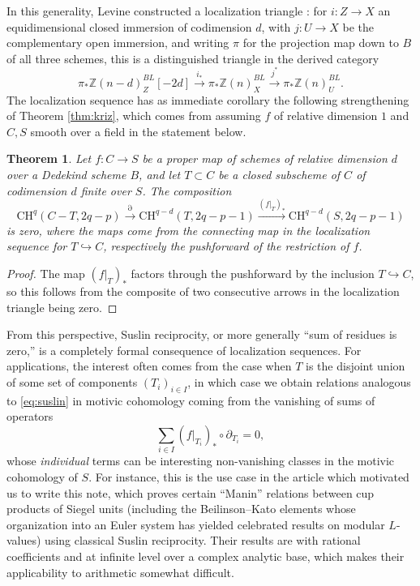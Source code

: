\documentclass[a4paper,reqno,11pt]{amsart}
\theoremstyle{plain}
\newtheorem{theorem}{Theorem}[section]
\theoremstyle{definition}
\theoremstyle{remark}
\newcommand{\CH}{{\mathrm{CH}}}
\newcommand{\Z}{\mathbb{Z}}
\begin{document}
In this generality, Levine constructed a localization triangle \cite[Theorem 1.7]{L2}: for $i:Z\to X$ an equidimensional closed immersion of codimension $d$, with $j:U\to X$ be the complementary open immersion, and writing $\pi$ for the projection map down to $B$ of all three schemes, this is a distinguished triangle in the derived category
\[
\pi_*\Z(n-d)^{BL}_Z[-2d] \xrightarrow{i_*} \pi_*\Z(n)_X^{BL} \xrightarrow{j^*} \pi_*\Z(n)_U^{BL}.
\]
The localization sequence has as immediate corollary the following strengthening of Theorem \ref{thm:kriz}, which comes from assuming $f$ of relative dimension $1$ and $C,S$ smooth over a field in the statement below.

\begin{theorem} \label{thm:naive}
    Let $f:C\to S$ be a proper map of schemes of relative dimension $d$ over a Dedekind scheme $B$, and let $T\subset C$ be a closed subscheme of $C$ of codimension $d$ finite over $S$. The composition
    \[
        \CH^q(C-T, 2q-p)\xrightarrow{\partial} \CH^{q-d}(T,2q-p-1) \xrightarrow{(f|_T)_*} \CH^{q-d}(S, 2q-p-1)
    \]
    is zero, where the maps come from the connecting map in the localization sequence for $T\hookrightarrow C$, respectively the pushforward of the restriction of $f$. 
\end{theorem}
\begin{proof}
    The map $(f|_T)_*$ factors through the pushforward by the inclusion $T\hookrightarrow C$, so this follows from the composite of two consecutive arrows in the localization triangle being zero.
\end{proof}

From this perspective, Suslin reciprocity, or more generally ``sum of residues is zero,'' is a completely formal consequence of localization sequences. For applications, the interest often comes from the case when $T$ is the disjoint union of some set of components $(T_i)_{i\in I}$, in which case we obtain relations analogous to \eqref{eq:suslin} in motivic cohomology coming from the vanishing of sums of operators
\[
\sum_{i\in I} (f|_{T_i})_* \circ \partial_{T_i}=0,
\]
whose \emph{individual} terms can be interesting non-vanishing classes in the motivic cohomology of $S$. For instance, this is the use case in the article  \cite{BPPS} which motivated us to write this note, which proves certain ``Manin'' relations between cup products of Siegel units (including the Beilinson--Kato elements whose organization into an Euler system has yielded celebrated results on modular $L$-values) using classical Suslin reciprocity. Their results are with rational coefficients and at infinite level over a complex analytic base, which makes their applicability to arithmetic somewhat difficult.
\end{document}
